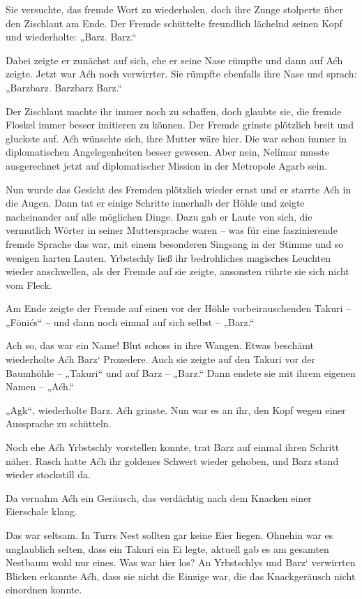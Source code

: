 Sie versuchte, das fremde Wort zu wiederholen, doch ihre Zunge stolperte über den Zischlaut am Ende. Der Fremde schüttelte freundlich lächelnd seinen Kopf und wiederholte: „Barz. Barz.“

Dabei zeigte er zunächst auf sich, ehe er seine Nase rümpfte und dann auf Aćh zeigte. Jetzt war Aćh noch verwirrter. Sie rümpfte ebenfalls ihre Nase und sprach: „Barzbarz. Barzbarz Barz.“

Der Zischlaut machte ihr immer noch zu schaffen, doch glaubte sie, die fremde Floskel immer besser imitieren zu können. Der Fremde grinste plötzlich breit und gluckste auf. Aćh wünschte sich, ihre Mutter wäre hier. Die war schon immer in diplomatischen Angelegenheiten besser gewesen. Aber nein, Nelímar musste ausgerechnet jetzt auf diplomatischer Mission in der Metropole Agarb sein.

Nun wurde das Gesicht des Fremden plötzlich wieder ernst und er starrte Aćh in die Augen. Dann tat er einige Schritte innerhalb der Höhle und zeigte nacheinander auf alle möglichen Dinge. Dazu gab er Laute von sich, die vermutlich Wörter in seiner Muttersprache waren – was für eine faszinierende fremde Sprache das war, mit einem besonderen Singsang in der Stimme und so wenigen harten Lauten. Yrbstschly ließ ihr bedrohliches magisches Leuchten wieder anschwellen, als der Fremde auf sie zeigte, ansonsten rührte sie sich nicht vom Fleck.

Am Ende zeigte der Fremde auf einen vor der Höhle vorbeirauschenden Takuri – „Fönićs“ – und dann noch einmal auf sich selbst – „Barz.“

Ach so, das war ein Name! Blut schoss in ihre Wangen. Etwas beschämt wiederholte Aćh Barz‘ Prozedere. Auch sie zeigte auf den Takuri vor der Baumhöhle – „Takuri“ und auf Barz – „Barz.“ Dann endete sie mit ihrem eigenen Namen – „Aćh.“

„Agk“, wiederholte Barz. Aćh grinste. Nun war es an ihr, den Kopf wegen einer Aussprache zu schütteln.

Noch ehe Aćh Yrbstschly vorstellen konnte, trat Barz auf einmal ihren Schritt näher. Rasch hatte Aćh ihr goldenes Schwert wieder gehoben, und Barz stand wieder stockstill da.

Da vernahm Aćh ein Geräusch, das verdächtig nach dem Knacken einer Eierschale klang.

Das war seltsam. In Turrs Nest sollten gar keine Eier liegen. Ohnehin war es unglaublich selten, dass ein Takuri ein Ei legte, aktuell gab es am gesamten Nestbaum wohl nur eines. Was war hier los? An Yrbstschlys und Barz‘ verwirrten Blicken erkannte Aćh, dass sie nicht die Einzige war, die das Knackgeräusch nicht einordnen konnte.

